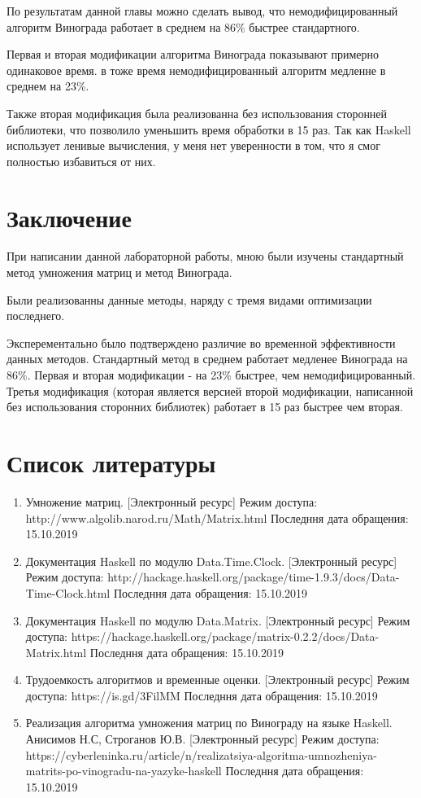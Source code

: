 \documentclass[12pt]{report}
\begin{document}
	По результатам данной главы можно сделать вывод, что немодифицированный алгоритм Винограда работает в среднем на 86\% быстрее стандартного.
	
	Первая и вторая модификации алгоритма Винограда показывают примерно одинаковое время. в тоже время немодифицированный алгоритм медленне в среднем на 23\%.

	Также вторая модификация была реализованна без использования сторонней библиотеки, что позволило уменьшить время обработки в 15 раз. 
Так как Haskell использует ленивые вычисления, у меня нет уверенности в том, что я смог полностью избавиться от них.

\chapter*{Заключение}

При написании данной лабораторной работы, мною были изучены стандартный метод умножения матриц и метод Винограда.

Были реализованны данные методы, наряду с тремя видами оптимизации последнего.

Эксперементально было подтверждено различие во временной эффективности данных методов.
Стандартный метод в среднем работает медленее Винограда на 86\%. Первая и вторая модификации - на 23\% быстрее, чем немодифицированный.
Третья модификация (которая является версией второй модификации, написанной без использования сторонних библиотек) работает в 15 раз быстрее чем вторая.

\chapter*{Список литературы}
\begin{enumerate}
	\item Умножение матриц. [Электронный ресурс] Режим доступа: http://www.algolib.narod.ru/Math/Matrix.html Последння дата обращения: 15.10.2019
	\item Документация Haskell по модулю Data.Time.Clock. [Электронный ресурс] Режим доступа: http://hackage.haskell.org/package/time-1.9.3/docs/Data-Time-Clock.html Последння дата обращения: 15.10.2019
	\item Документация Haskell по модулю Data.Matrix. [Электронный ресурс] Режим доступа: https://hackage.haskell.org/package/matrix-0.2.2/docs/Data-Matrix.html Последння дата обращения: 15.10.2019
	\item Трудоемкость алгоритмов и временные оценки. [Электронный ресурс] Режим доступа: https://is.gd/3FilMM Последння дата обращения: 15.10.2019
	\item Реализация алгоритма умножения матриц по Винограду на языке Haskell. Анисимов Н.С, Строганов Ю.В. [Электронный ресурс] Режим доступа: https://cyberleninka.ru/article/n/realizatsiya-algoritma-umnozheniya-matrits-po-vinogradu-na-yazyke-haskell Последння дата обращения: 15.10.2019
\end{enumerate}
\end{document}
